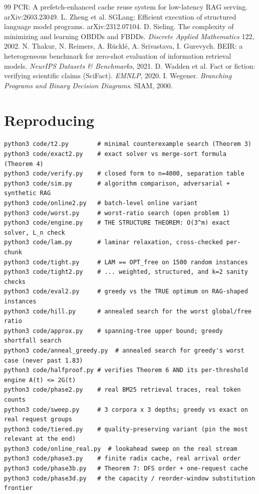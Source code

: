 \documentclass[11pt]{article}
\theoremstyle{plain}
\begin{document}
\begin{thebibliography}{99}
 PCR: A prefetch-enhanced cache reuse system for low-latency RAG serving. arXiv:2603.23049.
 L. Zheng et al. SGLang: Efficient execution of structured language model programs. arXiv:2312.07104.
 D. Sieling. The complexity of minimizing and learning OBDDs and FBDDs. \emph{Discrete Applied Mathematics} 122, 2002.
 N. Thakur, N. Reimers, A. Rücklé, A. Srivastava, I. Gurevych. BEIR: a heterogeneous benchmark for zero-shot evaluation of information retrieval models. \emph{NeurIPS Datasets \& Benchmarks}, 2021.
 D. Wadden et al. Fact or fiction: verifying scientific claims (SciFact). \emph{EMNLP}, 2020.
 I. Wegener. \emph{Branching Programs and Binary Decision Diagrams}. SIAM, 2000.
\end{thebibliography}
\section{Reproducing}

{\footnotesize\begin{verbatim}
python3 code/t2.py        # minimal counterexample search (Theorem 3)
python3 code/exact2.py    # exact solver vs merge-sort formula (Theorem 4)
python3 code/verify.py    # closed form to n=4000, separation table
python3 code/sim.py       # algorithm comparison, adversarial + synthetic RAG
python3 code/online2.py   # batch-level online variant
python3 code/worst.py     # worst-ratio search (open problem 1)
python3 code/engine.py    # THE STRUCTURE THEOREM: O(3^m) exact solver, L_n check
python3 code/lam.py       # laminar relaxation, cross-checked per-chunk
python3 code/tight.py     # LAM == OPT_free on 1500 random instances
python3 code/tight2.py    # ... weighted, structured, and k=2 sanity checks
python3 code/eval2.py     # greedy vs the TRUE optimum on RAG-shaped instances
python3 code/hill.py      # annealed search for the worst global/free ratio
python3 code/approx.py    # spanning-tree upper bound; greedy shortfall search
python3 code/anneal_greedy.py  # annealed search for greedy's worst case (never past 1.83)
python3 code/halfproof.py # verifies Theorem 6 AND its per-threshold engine A(t) <= 2G(t)
python3 code/phase2.py    # real BM25 retrieval traces, real token counts
python3 code/sweep.py     # 3 corpora x 3 depths; greedy vs exact on real request groups
python3 code/tiered.py    # quality-preserving variant (pin the most relevant at the end)
python3 code/online_real.py  # lookahead sweep on the real stream
python3 code/phase3.py    # finite radix cache, real arrival order
python3 code/phase3b.py   # Theorem 7: DFS order + one-request cache
python3 code/phase3d.py   # the capacity / reorder-window substitution frontier
\end{verbatim}}
\end{document}
